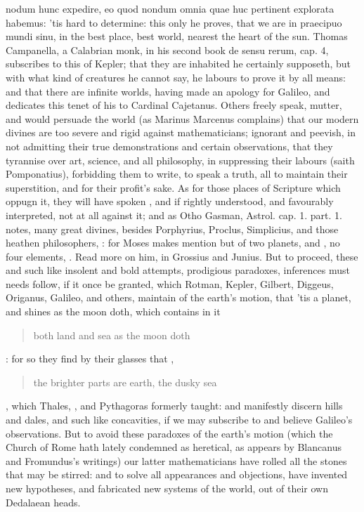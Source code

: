{{nodum hunc expedire, eo quod nondum omnia quae huc pertinent explorata
habemus}: 'tis hard to determine: this only he proves, that we are in
praecipuo mundi sinu, in the best place, best world, nearest the heart
of the sun. Thomas Campanella, a Calabrian monk, in his second
book de sensu rerum, cap. 4, subscribes to this of Kepler; that they
are inhabited he certainly supposeth, but with what kind of creatures
he cannot say, he labours to prove it by all means: and that there are
infinite worlds, having made an apology for Galileo, and dedicates this
tenet of his to Cardinal Cajetanus. Others freely speak, mutter, and
would persuade the world (as Marinus Marcenus complains) that our
modern divines are too severe and rigid against mathematicians;
ignorant and peevish, in not admitting their true demonstrations and
certain observations, that they tyrannise over art, science, and all
philosophy, in suppressing their labours (saith Pomponatius),
forbidding them to write, to speak a truth, all to maintain their
superstition, and for their profit's sake. As for those places of
Scripture which oppugn it, they will have spoken , and
if rightly understood, and favourably interpreted, not at all against
it; and as Otho Gasman, Astrol. cap. 1. part. 1. notes, many great
divines, besides Porphyrius, Proclus, Simplicius, and those heathen
philosophers, : for Moses makes mention but of two planets, 
and , no four elements, \etc{}. Read more on him, in Grossius and
Junius. But to proceed, these and such like insolent and bold attempts,
prodigious paradoxes, inferences must needs follow, if it once be
granted, which Rotman, Kepler, Gilbert, Diggeus, Origanus, Galileo, and
others, maintain of the earth's motion, that 'tis a planet, and shines
as the moon doth, which contains in it \blockquote{both land and sea as the
moon doth}: for so they find by their glasses that , \blockquote{the brighter parts are earth, the dusky sea}, which Thales,
\Plutarch, and Pythagoras formerly taught: and manifestly discern hills
and dales, and such like concavities, if we may subscribe to and
believe Galileo's observations. But to avoid these paradoxes of the
earth's motion (which the Church of Rome hath lately condemned as
heretical, as appears by Blancanus and Fromundus's writings) our latter
mathematicians have rolled all the stones that may be stirred: and to
solve all appearances and objections, have invented new hypotheses, and
fabricated new systems of the world, out of their own Dedalaean heads.

}
